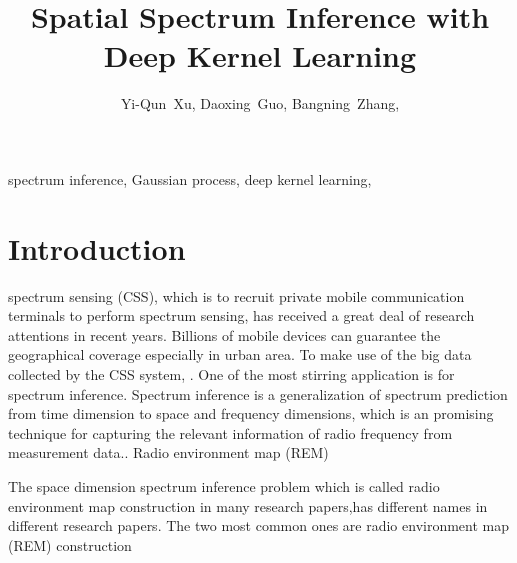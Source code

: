 \documentclass[journal, oneside, twocolumn]{IEEEtran}
\date{}
\title{Spatial Spectrum Inference with Deep Kernel Learning}
\begin{document}
\author{
Yi-Qun~Xu,
Daoxing~Guo,%
Bangning~Zhang,%

}


\maketitle


\begin{abstract}

\end{abstract}


\begin{IEEEkeywords}
spectrum inference, Gaussian process, deep kernel learning, 
\end{IEEEkeywords}

\section{Introduction}
 spectrum sensing (CSS), which is to recruit private mobile communication terminals to perform spectrum sensing, has received a great deal of research attentions \cite{Ding2014, Jin2018, Han2019, Hu2020, Amin2020} in recent years. Billions of mobile devices can guarantee the geographical coverage especially in urban area. To make use of the big data collected by the CSS system, . One of the most stirring application is for spectrum inference. Spectrum inference is a generalization of spectrum prediction from time dimension to space and frequency dimensions, which is an promising technique for capturing the relevant information of radio frequency from measurement data.\cite{Ding2018}. Radio environment map (REM) 


The space dimension spectrum inference problem which is called radio environment map construction in many research papers,has different names in different research papers. The two most common ones are radio environment map (REM) construction \cite{Phillips2012, Pesko2014, Sato2017, Li2018, Katagiri2020}  
\end{document}
